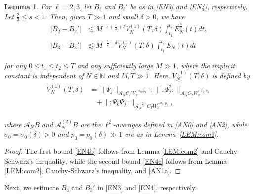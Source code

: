 \documentclass[letterpaper, 11pt,  reqno]{amsart}
\newtheorem{lemma}[theorem]{Lemma}
\newcommand{\1}{\hspace{0.5mm}\text{I}\hspace{0.2mm}}
\newcommand{\noi}{\noindent}
\newcommand{\N}{\mathbb{N}}
\newcommand{\dl}{\delta}
\newcommand{\les}{\lesssim}
\newcommand{\A}{\mathcal{A}}
\newcommand{\EN}{E_N}
\newcommand{\wick}[1]{:\!{#1}\!:}
\renewcommand{\l}{\ell}
\numberwithin{equation}{section}
\numberwithin{theorem}{section}
\begin{document}
\begin{lemma}
\label{LEM:com4} 
For  $\l = 2, 3$, 
let $B_\l$ and $B_\l'$ be as in \eqref{EN3} and \eqref{EN4}, respectively.
Let $\frac 23 \le s < 1$.
 Then, given $T \gg 1$ and small $\dl > 0$, we have
\begin{align} 
| B_2 - B_2' | 
& \les
 M^{- s + \frac 12 + \dl} V_N^{(1)} (T, \dl) \int_{t_1}^{t_2} 
\EN ^{\frac 32} (t) d t, 
\label{EN4b}\\
| B_3 - B_3' | 
& \les M^{- \frac {s}{2} + \dl} V_N^{(1)}  (T, \dl) 
\int_{t_1}^{t_2} \EN(t) d t 
\label{EN4c}
\end{align}


\noi
for any 
$0 \le t_1 \le t_2 \le T$ and 
any sufficiently large $M \gg 1$, 
where the implicit constant is independent of 
$N \in \N$ and  $M,  T \gg 1$.
Here, 
$ V_N^{(1)} ( T, \dl )$
is defined by 
\begin{align} 
\begin{split}
V_N^{(1)} (T, \dl)
& =  \| \Psi_j \|_{\A_N C_T W_x^{-\sigma_0, p_0}} 
+ \| \wick{ \Psi_j^2 } \|_{\A_N C_T W_x^{-\sigma_0, p_0}} \\
& \quad 
 + \| \wick{ \Psi_k \Psi_j } \|_{\A_N^{(2)}C_T W_x^{-\sigma_0, p_0}},
\end{split}
\label{EN4d} 
\end{align} 

\noi
where 
$\A_N B$ and $\A_N^{(2)} B$ are 
the $\l^2$-averages defined  in \eqref{AN0} and \eqref{AN2}, 
while
$\sigma_0 = \sigma_0 (\dl) >0$ and $p_0 = p_0 (\dl) \gg 1$ are as  in Lemma~\ref{LEM:com2}.






\end{lemma}

\begin{proof}
The first bound \eqref{EN4b} follows 
from 
Lemma \ref{LEM:com2}
and Cauchy-Schwarz's inequality, 
while the 
second  bound \eqref{EN4c} follows 
from 
Lemma \ref{LEM:com2}, 
Cauchy-Schwarz's inequality,
and \eqref{AN1a}.
 \end{proof} 






Next, we estimate
$B_4$ and $B_3'$  in \eqref{EN3} and \eqref{EN4}, respectively.
\end{document}
